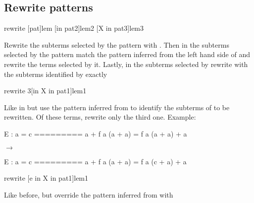 \begin{landscape}
\begin{small}
\begin{multicols*}{3}[\begin{center}\section*{}\end{center}]
% 
% 


\subsection*{Rewrite patterns}

\begin{cheat}
rewrite [pat]lem [in pat2]lem2 [X in pat3]lem3
\end{cheat}
  Rewrite the subterms selected by the pattern  with .
  Then in the subterms selected by the pattern 
  match the pattern inferred from the left hand side of  and
  rewrite the terms selected by it. Lastly, in the subterms selected by
   rewrite with  the subterms identified by  exactly

\begin{cheat}
rewrite {3}[in X in pat1]lem1
\end{cheat}
  Like in  but use the pattern
  inferred from  to identify the subterms of  to be
  rewritten. Of these terms, rewrite only the third one. Example:

\begin{cheatout}
E : a = c
=========
a + f a (a + a) =
  f a (a + a) + a
\end{cheatout}
$\to$
\begin{cheatout}
E : a = c
=========
a + f a (a + a) =
  f a (c + a) + a
\end{cheatout}



\begin{cheat}
rewrite [e in X in pat1]lem1
\end{cheat}
  Like before, but override the pattern inferred from  with


\end{multicols*}
\end{small}
\end{landscape}
